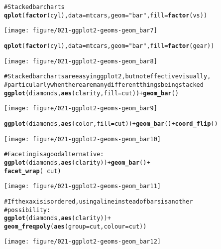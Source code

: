 \documentclass[a4paper,titlepage]{tufte-handout}\usepackage{graphicx, color}
\makeatletter
\def\maxwidth{ %
  \ifdim\Gin@nat@width>\linewidth
    \linewidth
  \else
    \Gin@nat@width
  \fi
}
\newcommand{\hlfunctioncall}[1]{\textcolor[rgb]{0.501960784313725,0,0.329411764705882}{\textbf{#1}}}%
\newcommand{\hlstring}[1]{\textcolor[rgb]{0.6,0.6,1}{#1}}%
\newcommand{\hlcomment}[1]{\textcolor[rgb]{0.180392156862745,0.6,0.341176470588235}{#1}}%
\newenvironment{kframe}{%
 \def\at@end@of@kframe{}%
 \ifinner\ifhmode%
  \def\at@end@of@kframe{\end{minipage}}%
  \begin{minipage}{\columnwidth}%
 \fi\fi%
 \def\FrameCommand##1{\hskip\@totalleftmargin \hskip-\fboxsep
 \colorbox{shadecolor}{##1}\hskip-\fboxsep
     \hskip-\linewidth \hskip-\@totalleftmargin \hskip\columnwidth}%
 \MakeFramed {\advance\hsize-\width
   \@totalleftmargin\z@ \linewidth\hsize
   \@setminipage}}%
 {\par\unskip\endMakeFramed%
 \at@end@of@kframe}
\newenvironment{knitrout}{}{} %
\makeatother
\begin{document}
\begin{knitrout}
\begin{kframe}
\begin{alltt}
\hlcomment{# Stacked bar charts}
\hlfunctioncall{qplot}(\hlfunctioncall{factor}(cyl), data=mtcars, geom=\hlstring{"bar"}, fill=\hlfunctioncall{factor}(vs))
\end{alltt}
\end{kframe}\texttt{[image: figure/021-ggplot2-geoms-geom\_bar7]} \begin{kframe}\begin{alltt}
\hlfunctioncall{qplot}(\hlfunctioncall{factor}(cyl), data=mtcars, geom=\hlstring{"bar"}, fill=\hlfunctioncall{factor}(gear))
\end{alltt}
\end{kframe}\texttt{[image: figure/021-ggplot2-geoms-geom\_bar8]} \begin{kframe}\begin{alltt}
\hlcomment{# Stacked bar charts are easy in ggplot2, but not effective visually,}
\hlcomment{# particularly when there are many different things being stacked}
\hlfunctioncall{ggplot}(diamonds, \hlfunctioncall{aes}(clarity, fill=cut)) + \hlfunctioncall{geom_bar}()
\end{alltt}
\end{kframe}\texttt{[image: figure/021-ggplot2-geoms-geom\_bar9]} \begin{kframe}\begin{alltt}
\hlfunctioncall{ggplot}(diamonds, \hlfunctioncall{aes}(color, fill=cut)) + \hlfunctioncall{geom_bar}() + \hlfunctioncall{coord_flip}()
\end{alltt}
\end{kframe}\texttt{[image: figure/021-ggplot2-geoms-geom\_bar10]} \begin{kframe}\begin{alltt}
\hlcomment{# Faceting is a good alternative:}
\hlfunctioncall{ggplot}(diamonds, \hlfunctioncall{aes}(clarity)) + \hlfunctioncall{geom_bar}() +
  \hlfunctioncall{facet_wrap}(~ cut)
\end{alltt}
\end{kframe}\texttt{[image: figure/021-ggplot2-geoms-geom\_bar11]} \begin{kframe}\begin{alltt}
\hlcomment{# If the x axis is ordered, using a line instead of bars is another}
\hlcomment{# possibility:}
\hlfunctioncall{ggplot}(diamonds, \hlfunctioncall{aes}(clarity)) +
  \hlfunctioncall{geom_freqpoly}(\hlfunctioncall{aes}(group = cut, colour = cut))
\end{alltt}
\end{kframe}\texttt{[image: figure/021-ggplot2-geoms-geom\_bar12]} \begin{kframe}\begin{alltt}

\end{alltt}
\end{kframe}
\end{knitrout}
\end{document}
